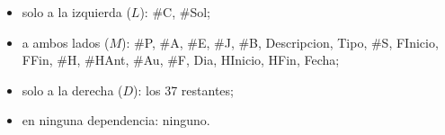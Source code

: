 \begin{itemize}
  \item solo a la izquierda ($L$): \#C, \#Sol;
  \item a ambos lados ($M$): \#P, \#A, \#E, \#J, \#B, Descripcion, Tipo, \#S, FInicio, FFin, \#H, \#HAnt, \#Au, \#F, Dia, HInicio, HFin, Fecha;
  \item solo a la derecha ($D$): los 37 restantes;
  \item en ninguna dependencia: ninguno.
\end{itemize}
